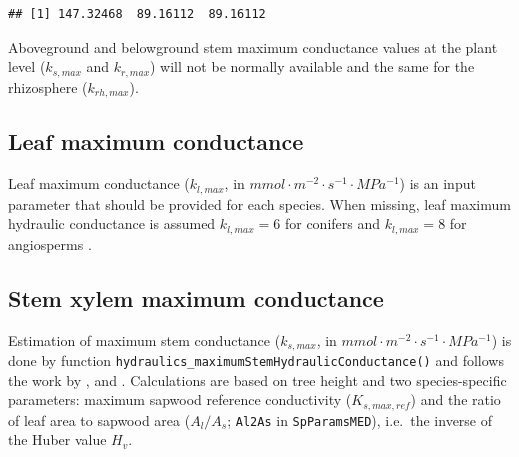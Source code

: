 \documentclass[]{book}
\newenvironment{Shaded}{\begin{snugshade}}{\end{snugshade}}
\newcommand{\OperatorTok}[1]{\textcolor[rgb]{0.81,0.36,0.00}{\textbf{#1}}}
\newcommand{\NormalTok}[1]{#1}
\begin{document}
\begin{Shaded}
\end{Shaded}

\begin{verbatim}
## [1] 147.32468  89.16112  89.16112
\end{verbatim}

Aboveground and belowground stem maximum conductance values at the plant level (\(k_{s, max}\) and \(k_{r, max}\)) will not be normally available and the same for the rhizosphere (\(k_{rh, max}\)).

\hypertarget{leaf-maximum-conductance}{%
\subsection{Leaf maximum conductance}\label{leaf-maximum-conductance}}

Leaf maximum conductance (\(k_{l, max}\), in \(mmol \cdot m^{-2} \cdot s^{-1} \cdot MPa^{-1}\)) is an input parameter that should be provided for each species. When missing, leaf maximum hydraulic conductance is assumed \(k_{l, max}=6\) for conifers and \(k_{l, max}=8\) for angiosperms \citep{Sack2006}.

\hypertarget{stem-xylem-maximum-conductance}{%
\subsection{Stem xylem maximum conductance}\label{stem-xylem-maximum-conductance}}

Estimation of maximum stem conductance (\(k_{s,max}\), in \(mmol \cdot m^{-2} \cdot s^{-1} \cdot MPa^{-1}\)) is done by function \texttt{hydraulics\_maximumStemHydraulicConductance()} and follows the work by \citet{Savage2010}, \citet{Olson2014} and \citet{Christoffersen2016}. Calculations are based on tree height and two species-specific parameters: maximum sapwood reference conductivity (\(K_{s,max,ref}\)) and the ratio of leaf area to sapwood area (\(A_{l}/A_{s}\); \texttt{Al2As} in \texttt{SpParamsMED}), i.e.~the inverse of the Huber value \(H_v\).
\end{document}

